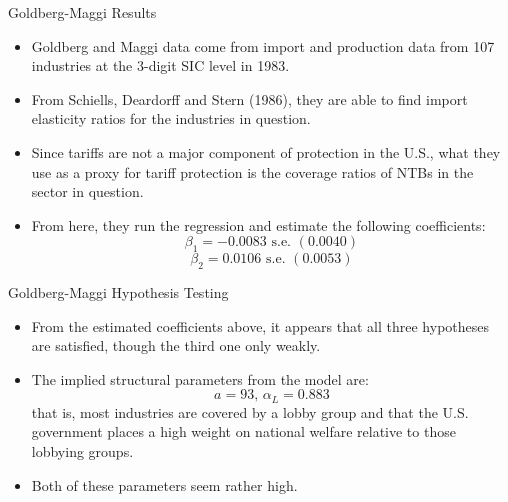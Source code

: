 \documentclass[aspectratio=169]{beamer}
\begin{document}
\begin{frame}{Goldberg-Maggi Results}

\begin{itemize}
    \item<1-> Goldberg and Maggi data come from import and production data from 107 industries at the 3-digit SIC level in 1983.
    \item<2-> From Schiells, Deardorff and Stern (1986), they are able to find import elasticity ratios for the industries in question.
    \item<3-> Since tariffs are not a major component of protection in the U.S., what they use as a proxy for tariff protection is the coverage ratios of NTBs in the sector in question.
    \item<4-> From here, they run the regression and estimate the following coefficients:
    \begin{equation*}
        \beta_{1} = -0.0083 \text{ s.e. } \left( 0.0040 \right)
    \end{equation*}
    \begin{equation*}
        \beta_{2} = 0.0106 \text{ s.e. } \left( 0.0053 \right)
    \end{equation*}
\end{itemize}
    
\end{frame}


\begin{frame}{Goldberg-Maggi Hypothesis Testing}

\begin{itemize}
    \item<1-> From the estimated coefficients above, it appears that all three hypotheses are satisfied, though the third one only weakly.
    \item<2-> The implied structural parameters from the model are:
    \begin{equation*}
        a = 93 \text{,  } \alpha_{L} = 0.883
    \end{equation*}
    that is, most industries are covered by a lobby group and that the U.S. government places a high weight on national welfare relative to those lobbying groups.
    \item<3-> Both of these parameters seem rather high.
\end{itemize}
    
\end{frame}
\end{document}
